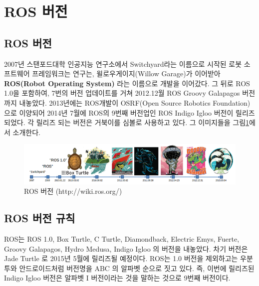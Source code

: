 \section{ROS 버전}

\subsection{ROS 버전}

2007년 스탠포드대학 인공지능 연구소에서 Switchyard라는 이름으로 시작된 로봇 소프트웨어 프레임워크는 연구는, 윌로우게이지(Willow Garage)가 이어받아 \textbf{ROS(Robot Operating System)} 라는 이름으로 개발을 이어갔다. 그 뒤로 ROS 1.0을 포함하여, 7번의 버전 업데이트를 거쳐 2012.12월 ROS Groovy Galapagos 버전까지 내놓았다. 2013년에는 ROS개발이 OSRF(Open Source Robotics Foundation)으로 이양되어 2014년 7월에 ROS의 9번째 버전업인 ROS Indigo Igloo 버전이 릴리즈되었다. 각 릴리즈 되는 버전은 거북이를 심볼로 사용하고 있다. 그 이미지들을 그림\ref{fig:rosversion}에서 소개한다.

\begin{figure}[h]
\centering\includegraphics[width=\columnwidth]{pictures/chapter1/2013rosversion.png}
\caption{ROS 버전 (http://wiki.ros.org/)}
\label{fig:rosversion}
\end{figure}

\subsection{ROS 버전 규칙}

ROS는 ROS 1.0, Box Turtle, C Turtle, Diamondback, Electric Emys, Fuerte, Groovy Galapagos, Hydro Medusa, Indigo Igloo 의 버전을 내놓았다. 차기 버전은 Jade Turtle 로 2015년 5월에 릴리즈될 예정이다. ROS는 1.0 버전을 제외하고는 우분투와 안드로이드처럼 버전명을 ABC 의 알파벳 순으로 짓고 있다. 즉, 이번에 릴리즈된 Indigo Igloo 버전은 알파벳 I 버전이라는 것을 말하는 것으로 9번째 버전이다.

